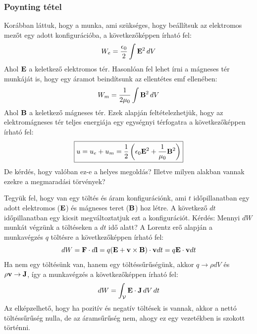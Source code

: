 \documentclass[a4paper,12pt]{article}
\begin{document}
\subsubsection{Poynting tétel}
Korábban láttuk, hogy a munka, ami szükséges, hogy beállítsuk az elektromos mezőt egy adott konfigurációba, a következőképpen írható fel:
\begin{equation}
    W_e = \frac{\epsilon_0}{2} \int \bold{E}^2 \, dV
\end{equation}
Ahol $\bold{E}$ a keletkező elektromos tér. Hasonlóan fel lehet írni a mágneses tér munkáját is, hogy egy áramot beindítsunk az ellentétes emf ellenében:
\begin{equation}
    W_m = \frac{1}{2 \mu_0} \int \bold{B}^2 \, dV
\end{equation}
Ahol $\bold{B}$ a keletkező mágneses tér. Ezek alapján feltételezhetjük, hogy az elektromágneses tér teljes energiája egy egységnyi térfogatra a következőképpen írható fel:
\begin{equation}
    \boxed{u = u_e + u_m = \frac{1}{2} \left( \epsilon_0 \bold{E}^2 + \frac{1}{\mu_0} \bold{B}^2 \right)}
\end{equation}
De kérdés, hogy valóban ez-e a helyes megoldás? Illetve milyen alakban vannak ezekre a megmaradási törvények?

Tegyük fel, hogy van egy töltés és áram konfigurációnk, ami $t$ időpillanatban egy adott elektromos ($\bold{E}$) és mágneses teret ($\bold{B}$) hoz létre.
A következő $dt$ időpillanatban egy kicsit megváltoztatjuk ezt a konfigurációt. Kérdés: Mennyi $dW$ munkát végzünk a töltéseken a $dt$ idő alatt?
A Lorentz erő alapján a munkavégzés $q$ töltésre a következőképpen írható fel:
\begin{equation}
    dW = \bold{F} \cdot d\bold{l} = q (\bold{E} + \bold{v} \times \bold{B}) \cdot \bold{v} dt = q \bold{E} \cdot \bold{v} dt
\end{equation}
Ha nem egy töltésünk van, hanem egy töltéssűrűségünk, akkor $q \rightarrow \rho dV$ és $\rho \bold{v} \rightarrow \bold{J}$, így a munkavégzés a következőképpen írható fel:
\begin{equation}
    dW = \int_{\mathcal{V}} \bold{E} \cdot \bold{J} \, dV \, dt
\end{equation}
Az elképzelhető, hogy ha pozitív és negatív töltések is vannak, akkor a nettó töltéssűrűség nulla, de az áramsűrűség nem, ahogy ez egy vezetékben is szokott történni.
\end{document}
